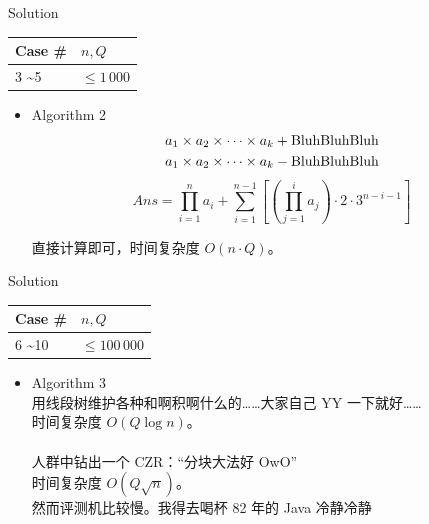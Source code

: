 \documentclass[UTF8]{beamer}
\begin{document}
\begin{frame}{Solution}

\begin{tabularx}{\textwidth}{X|X} \hline
Case \# & $n, Q$ \\ \hline \hline
3 \textasciitilde 5  & $\leq 1\,000$   \\ \hline
\end{tabularx}
\begin{itemize}
    \item Algorithm 2 \\
        \begin{align*}
            &a_1 \times a_2 \times \dots \times a_k + {\rm Bluh Bluh Bluh} \\
            &a_1 \times a_2 \times \dots \times a_k - {\rm Bluh Bluh Bluh}
        \end{align*}
        \pause
        $$
            Ans = \prod_{i = 1}^{n} a_i + \sum_{i = 1}^{n - 1} \left [\left (\prod_{j = 1}^i a_j \right ) \cdot 2 \cdot 3^{n - i - 1}\right ]
        $$

        直接计算即可，时间复杂度 $O(n \cdot Q)$。
\end{itemize}

\end{frame}

\begin{frame}{Solution}

\begin{tabularx}{\textwidth}{X|X} \hline
Case \# & $n, Q$ \\ \hline \hline
6 \textasciitilde 10 & $\leq 100\,000$ \\ \hline
\end{tabularx}
\begin{itemize}
    \item Algorithm 3 \\
        用线段树维护各种和啊积啊什么的……大家自己 YY 一下就好…… \\
        时间复杂度 $O(Q \log n)$。\\　\\
        \pause
        人群中钻出一个 CZR：“分块大法好 OwO” \\
        时间复杂度 $O(Q \sqrt n)$。\\
        \pause
        然而评测机比较慢。我得去喝杯 82 年的 Java 冷静冷静
\end{itemize}

\end{frame}
\end{document}
